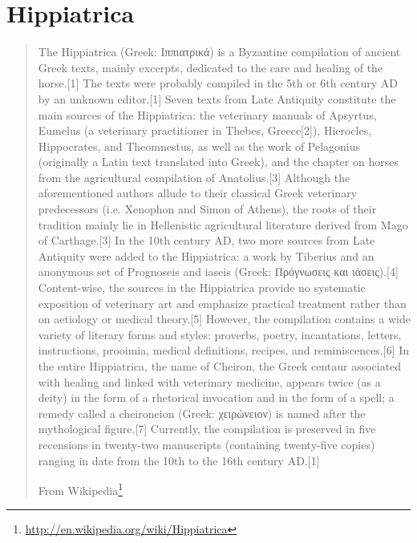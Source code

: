 \documentclass[12pt,letterpaper,twoside,final]{memoir}
\begin{document}
\section{Hippiatrica}
\blockquote[From Wikipedia\footnote{\url{http://en.wikipedia.org/wiki/Hippiatrica}}]{The Hippiatrica (Greek: Ιππιατρικά) is a Byzantine compilation of ancient Greek texts, mainly excerpts, dedicated to the care and healing of the horse.[1] The texts were probably compiled in the 5th or 6th century AD by an unknown editor.[1] Seven texts from Late Antiquity constitute the main sources of the Hippiatrica: the veterinary manuals of Apsyrtus, Eumelus (a veterinary practitioner in Thebes, Greece[2]), Hierocles, Hippocrates, and Theomnestus, as well as the work of Pelagonius (originally a Latin text translated into Greek), and the chapter on horses from the agricultural compilation of Anatolius.[3] Although the aforementioned authors allude to their classical Greek veterinary predecessors (i.e. Xenophon and Simon of Athens), the roots of their tradition mainly lie in Hellenistic agricultural literature derived from Mago of Carthage.[3] In the 10th century AD, two more sources from Late Antiquity were added to the Hippiatrica: a work by Tiberius and an anonymous set of Prognoseis and iaseis (Greek: Πρόγνωσεις και ιάσεις).[4] Content-wise, the sources in the Hippiatrica provide no systematic exposition of veterinary art and emphasize practical treatment rather than on aetiology or medical theory.[5] However, the compilation contains a wide variety of literary forms and styles: proverbs, poetry, incantations, letters, instructions, prooimia, medical definitions, recipes, and reminiscences.[6] In the entire Hippiatrica, the name of Cheiron, the Greek centaur associated with healing and linked with veterinary medicine, appears twice (as a deity) in the form of a rhetorical invocation and in the form of a spell; a remedy called a cheironeion (Greek: χειρώνειον) is named after the mythological figure.[7] Currently, the compilation is preserved in five recensions in twenty-two manuscripts (containing twenty-five copies) ranging in date from the 10th to the 16th century AD.[1]}
\end{document}
